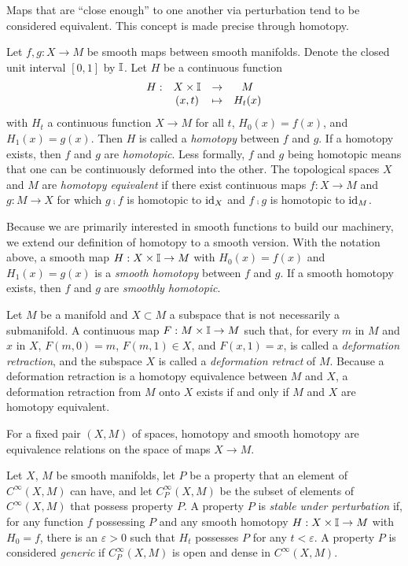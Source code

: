 Maps that are ``close enough'' to one another via perturbation tend to be considered equivalent.
This concept is made precise through homotopy.

\begin{defn}[Homotopy]
	\label{def:homotopy}
	Let $f,g:X\to M$ be smooth maps between smooth manifolds.
	Denote the closed unit interval $[0,1]$ by $\mathbb{I}$.
	Let $H$ be a continuous function 
	\[
		\begin{array}{cccc}
			H: & X\times \mathbb{I} & \to & M \\
			& (x,t)	& \mapsto & H_t(x)
		\end{array}
	\]
	with $H_t$ a continuous function $X\to M$ for all $t$, $H_0(x)=f(x)$, and $H_1(x)=g(x)$.
	Then $H$ is called a \emph{homotopy} between $f$ and $g$.
	If a homotopy exists, then $f$ and $g$ are \emph{homotopic}.
	Less formally, $f$ and $g$ being homotopic means that one can be continuously deformed into the other.
	The topological spaces $X$ and $M$ are \emph{homotopy equivalent} if there exist continuous maps $f:X\to M$ and $g:M\to X$ for which $g\comp f$ is homotopic to $\textrm{id}_{X}$ and $f\comp g$ is homotopic to $\textrm{id}_{M}$.
	
	Because we are primarily interested in smooth functions to build our machinery, we extend our definition of homotopy to a smooth version.
	With the notation above, a smooth map $H:X\times\mathbb{I}\to M$ with $H_0(x)=f(x)$ and $H_1(x)=g(x)$ is a \emph{smooth homotopy} between $f$ and $g$.
	If a smooth homotopy exists, then $f$ and $g$ are \emph{smoothly homotopic}.
	
	Let $M$ be a manifold and $X\subset M$ a subspace that is not necessarily a submanifold.
	A continuous map $F:M\times\mathbb{I}\to M$ such that, for every $m$ in $M$ and $x$ in $X$, $F(m,0)=m$, $F(m,1)\in X$, and $F(x,1)=x$, is called a \emph{deformation retraction}, and the subspace $X$ is called a \emph{deformation retract} of $M$.
	Because a deformation retraction is a homotopy equivalence between $M$ and $X$, a deformation retraction from $M$ onto $X$ exists if and only if $M$ and $X$ are homotopy equivalent.
\end{defn}

\begin{prop}
	For a fixed pair $(X,M)$ of spaces, homotopy and smooth homotopy are equivalence relations on the space of maps $X\to M$.
\end{prop}

\begin{defn}
	Let $X$, $M$ be smooth manifolds, let $P$ be a property that an element of $C^\infty(X,M)$ can have, and let $C_P^\infty(X,M)$ be the subset of elements of $C^\infty(X,M)$ that possess property $P$.
	A property $P$ is \emph{stable under perturbation} if, for any function $f$ possessing $P$ and any smooth homotopy $H:X\times \mathbb{I}\to M$ with $H_0=f$, there is an $\varepsilon>0$ such that $H_t$ possesses $P$ for any $t<\varepsilon$.
	A property $P$ is considered \emph{generic} if $C_P^\infty(X,M)$ is open and dense in $C^\infty(X,M)$.
\end{defn}


